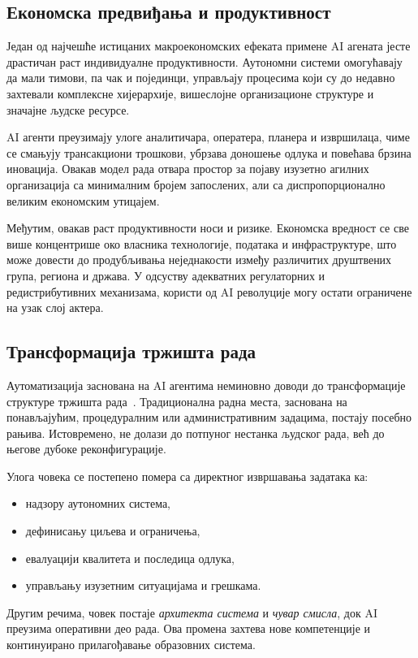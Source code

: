 \subsection{Економска предвиђања и продуктивност}

Један од најчешће истицаних макроекономских ефеката примене AI агената јесте драстичан раст индивидуалне продуктивности. Аутономни системи омогућавају да мали тимови, па чак и појединци, управљају процесима који су до недавно захтевали комплексне хијерархије, вишеслојне организационе структуре и значајне људске ресурсе.

AI агенти преузимају улоге аналитичара, оператера, планера и извршилаца, чиме се смањују трансакциони трошкови, убрзава доношење одлука и повећава брзина иновација. Овакав модел рада отвара простор за појаву изузетно агилних организација са минималним бројем запослених, али са диспропорционално великим економским утицајем.

Међутим, овакав раст продуктивности носи и ризике. Економска вредност се све више концентрише око власника технологије, података и инфраструктуре, што може довести до продубљивања неједнакости између различитих друштвених група, региона и држава. У одсуству адекватних регулаторних и редистрибутивних механизама, користи од AI револуције могу остати ограничене на узак слој актера.

\subsection{Трансформација тржишта рада}

Аутоматизација заснована на AI агентима неминовно доводи до трансформације структуре тржишта рада~\cite{frey2017,schwab2017}. Традиционална радна места, заснована на понављајућим, процедуралним или административним задацима, постају посебно рањива. Истовремено, не долази до потпуног нестанка људског рада, већ до његове дубоке реконфигурације.

Улога човека се постепено помера са директног извршавања задатака ка:
\begin{itemize}
    \item надзору аутономних система,
    \item дефинисању циљева и ограничења,
    \item евалуацији квалитета и последица одлука,
    \item управљању изузетним ситуацијама и грешкама.
\end{itemize}

Другим речима, човек постаје \textit{архитекта система} и \textit{чувар смисла}, док AI преузима оперативни део рада. Ова промена захтева нове компетенције и континуирано прилагођавање образовних система.

